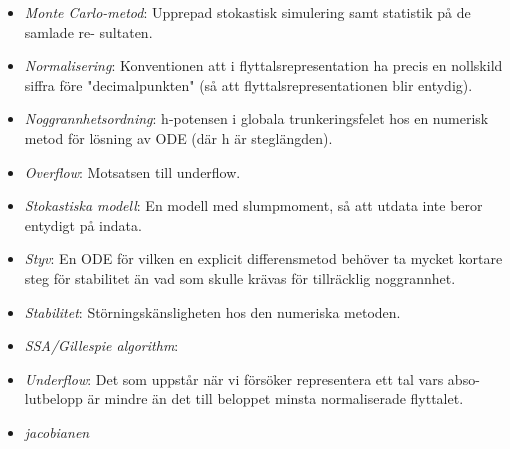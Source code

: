 \begin{itemize}
  \item \textit{Monte Carlo-metod}: Upprepad stokastisk simulering samt statistik på de samlade re-
sultaten.
  \item \textit{Normalisering}: Konventionen att i flyttalsrepresentation ha precis en nollskild
siﬀra före "decimalpunkten" (så att flyttalsrepresentationen blir
entydig).
  \item \textit{Noggrannhetsordning}: h-potensen i globala trunkeringsfelet hos en numerisk metod för
lösning av ODE (där h är steglängden).
  \item \textit{Overflow}: Motsatsen till underflow.
  \item \textit{Stokastiska modell}: En modell med slumpmoment, så att utdata inte beror entydigt
på indata.
 \item \textit{Styv}: En ODE för vilken en explicit diﬀerensmetod behöver ta mycket
kortare steg för stabilitet än vad som skulle krävas för tillräcklig
noggrannhet.
  \item \textit{Stabilitet}: Störningskänsligheten hos den numeriska metoden.
  \item \textit{SSA/Gillespie algorithm}:
  \item \textit{Underflow}: Det som uppstår när vi försöker representera ett tal vars abso-
lutbelopp är mindre än det till beloppet minsta normaliserade
flyttalet.
  \item \textit{jacobianen}
\end{itemize}
